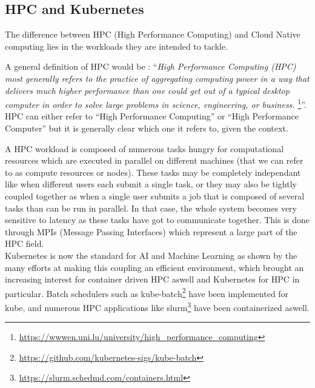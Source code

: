 \documentclass[12pt, a4paper]{memoir}
\begin{document}
\subsection{HPC and Kubernetes}
The difference between HPC (High Performance Computing) and Cloud Native computing lies in the workloads they are intended to tackle.

A general definition of HPC would be :
``\textit{High Performance Computing (HPC) most generally refers to the
		practice of aggregating computing power in a way that delivers
		much higher performance than one could get out of a typical
		desktop computer in order to solve large problems in science,
		engineering, or
		business.}
\footnote{\url{https://wwwen.uni.lu/university/high_performance_computing}}''.
HPC can either refer to ``High Performance Computing'' or ``High Performance
Computer'' but it is generally clear which one it refers to, given the
context.

A HPC workload is composed of numerous tasks hungry for computational resources
which are executed in parallel on different machines (that we can refer to as
compute resources or nodes). These tasks may be completely independant like
when different users each submit a single task, or they may also be tightly
coupled together as when a single user submits a job that is composed of
several tasks than can be run in parallel. In that case, the whole system
becomes very sensitive to latency as these tasks have got to communicate
together. This is done through MPIs (Message Passing Interfaces) which
represent a large part of the HPC field.\\


Kubernetes is now the standard for AI and Machine Learning as shown by the many
efforts at making this coupling an efficient
environment\cite{lee2017design}\cite{233001}\cite{10.1145/3154842.3154845},
which brought an increasing interest for container driven HPC aswell and
Kubernetes for HPC in particular. Batch schedulers such as
kube-batch\footnote{\url{https://github.com/kubernetes-sigs/kube-batch}} have
been implemented for kube, and numerous HPC applications like
slurm\footnote{\url{https://slurm.schedmd.com/containers.html}} have been
containerized aswell.
\end{document}
